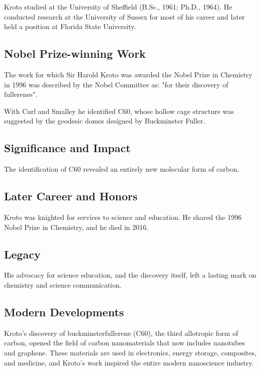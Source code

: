 Kroto studied at the University of Sheffield (B.Sc., 1961; Ph.D., 1964). He conducted research at the University of Sussex for most of his career and later held a position at Florida State University.

\subsection*{Nobel Prize-winning Work}

The work for which Sir Harold Kroto was awarded the Nobel Prize in Chemistry in 1996 was described by the Nobel Committee as: "for their discovery of fullerenes".

With Curl and Smalley he identified C60, whose hollow cage structure was suggested by the geodesic domes designed by Buckminster Fuller.

\subsection*{Significance and Impact}

The identification of C60 revealed an entirely new molecular form of carbon.

\subsection*{Later Career and Honors}

Kroto was knighted for services to science and education. He shared the 1996 Nobel Prize in Chemistry, and he died in 2016.

\subsection*{Legacy}

His advocacy for science education, and the discovery itself, left a lasting mark on chemistry and science communication.

\subsection*{Modern Developments}

Kroto's discovery of buckminsterfullerene (C60), the third allotropic form of carbon, opened the field of carbon nanomaterials that now includes nanotubes and graphene. These materials are used in electronics, energy storage, composites, and medicine, and Kroto's work inspired the entire modern nanoscience industry.

